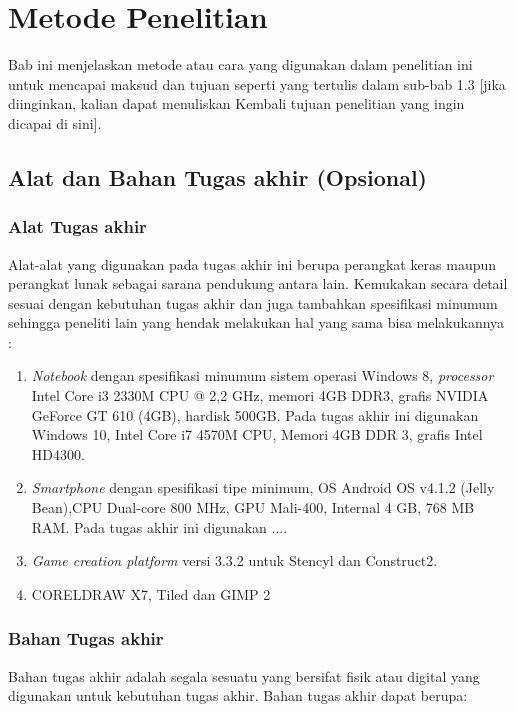 \chapter{Metode Penelitian}

Bab ini menjelaskan metode atau cara yang digunakan dalam penelitian ini untuk 
mencapai maksud dan tujuan seperti yang tertulis dalam sub-bab 1.3 [jika diinginkan, kalian dapat menuliskan Kembali tujuan penelitian yang ingin dicapai di sini].

\section{Alat dan Bahan Tugas akhir (Opsional)}

\subsection{Alat Tugas akhir}

Alat-alat yang digunakan pada tugas akhir ini berupa perangkat keras maupun perangkat lunak sebagai sarana pendukung antara lain. Kemukakan secara detail sesuai dengan kebutuhan tugas akhir dan juga tambahkan spesifikasi minumum sehingga peneliti lain yang hendak melakukan hal yang sama bisa melakukannya :

\begin{enumerate}
	\item \textit{Notebook} dengan spesifikasi minumum sistem operasi Windows 8, \textit{processor} Intel Core i3 2330M CPU @ 2,2 GHz, memori 4GB DDR3, grafis NVIDIA GeForce GT 610 (4GB), hardisk 500GB. Pada tugas akhir ini digunakan Windows 10, Intel Core i7 4570M CPU, Memori 4GB DDR 3, grafis Intel HD4300. 
	\item \textit{Smartphone} dengan spesifikasi tipe minimum, OS Android OS v4.1.2 (Jelly Bean),CPU Dual-core 800 MHz, GPU Mali-400, Internal 4 GB, 768 MB RAM. Pada tugas akhir ini digunakan ....
	\item \textit{Game creation platform} versi 3.3.2 untuk Stencyl dan Construct2.
	\item CORELDRAW X7, Tiled dan GIMP 2
\end{enumerate}

\subsection{Bahan Tugas akhir}

Bahan tugas akhir adalah segala sesuatu yang bersifat fisik atau digital yang digunakan untuk kebutuhan tugas akhir. Bahan tugas akhir dapat berupa:

